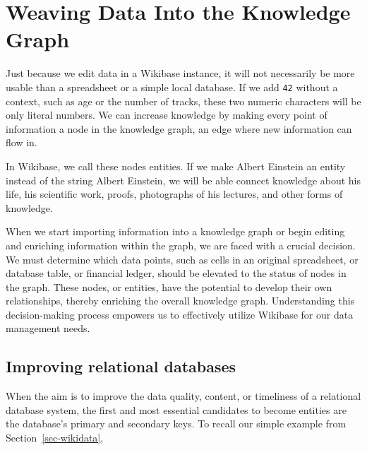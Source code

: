 \documentclass[
  letterpaper,
  DIV=11,
  numbers=noendperiod]{scrreprt}
\begin{document}
\section{Weaving Data Into the Knowledge
Graph}\label{weaving-data-into-the-knowledge-graph}

Just because we edit data in a Wikibase instance, it will not
necessarily be more usable than a spreadsheet or a simple local
database. If we add \texttt{42} without a context, such as age or the
number of tracks, these two numeric characters will be only literal
numbers. We can increase knowledge by making every point of information
a node in the knowledge graph, an edge where new information can flow
in.

In Wikibase, we call these nodes entities. If we make Albert Einstein an
entity instead of the string Albert Einstein, we will be able connect
knowledge about his life, his scientific work, proofs, photographs of
his lectures, and other forms of knowledge.

When we start importing information into a knowledge graph or begin
editing and enriching information within the graph, we are faced with a
crucial decision. We must determine which data points, such as cells in
an original spreadsheet, or database table, or financial ledger, should
be elevated to the status of nodes in the graph. These nodes, or
entities, have the potential to develop their own relationships, thereby
enriching the overall knowledge graph. Understanding this
decision-making process empowers us to effectively utilize Wikibase for
our data management needs.

\subsection{Improving relational
databases}\label{improving-relational-databases}

When the aim is to improve the data quality, content, or timeliness of a
relational database system, the first and most essential candidates to
become entities are the database's primary and secondary keys. To recall
our simple example from Section~\ref{sec-wikidata},
\end{document}
